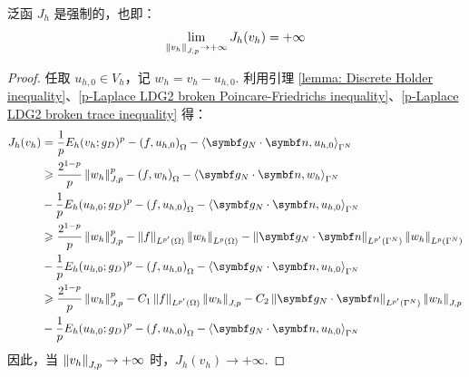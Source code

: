 \begin{proposition}[Coercivity]\label{p-Laplace LDG2 discrete coercivity} %
	泛函 \(J_{h}\) 是强制的，也即：
	\begin{equation*}
		\lim_{\left\lVert v_{h}\right\rVert_{J, p} \to +\infty} J_{h}(v_{h}) = +\infty
	\end{equation*}

	\begin{proof}
		任取 \(u_{h,0} \in V_{h}\)，记 \(w_{h} = v_{h} - u_{h,0}\). 利用引理 \ref{lemma: Discrete Holder inequality}、\ref{p-Laplace LDG2 broken Poincare-Friedrichs inequality}、\ref{p-Laplace LDG2 broken trace inequality} 得：
		\begin{align*}
			J_{h}(v_{h}) 
			& = \frac{1}{p} E_{h}(v_{h}; g_{D})^{p} - \left(f, u_{h,0}\right)_{\Omega} - \left\langle \bm g_{N} \cdot \bm n, u_{h,0} \right\rangle_{\Gamma^{N}} \\
			& \geqslant \frac{2^{1-p}}{p} \norm{w_{h}}_{J, p}^{p} - \left(f, w_{h}\right)_{\Omega} - \left\langle \bm g_{N} \cdot \bm n, w_{h} \right\rangle_{\Gamma^{N}} \\& - \frac{1}{p} E_{h}(u_{h,0}; g_{D})^{p} - \left(f, u_{h,0}\right)_{\Omega} - \left\langle \bm g_{N} \cdot \bm n, u_{h,0} \right\rangle_{\Gamma^{N}} \\
			& \geqslant \frac{2^{1-p}}{p} \norm{w_{h}}_{J, p}^{p} - \norm{f}_{L^{p'}(\Omega)} \norm{w_{h}}_{L^{p}(\Omega)} - \norm{\bm g_{N} \cdot \bm n}_{L^{p'}(\Gamma^{N})} \norm{w_{h}}_{L^{p}(\Gamma^{N})} \\& - \frac{1}{p} E_{h}(u_{h,0}; g_{D})^{p} - \left(f, u_{h,0}\right)_{\Omega} - \left\langle \bm g_{N} \cdot \bm n, u_{h,0} \right\rangle_{\Gamma^{N}} \\
			& \geqslant \frac{2^{1-p}}{p} \norm{w_{h}}_{J, p}^{p} - C_{1} \norm{f}_{L^{p'}(\Omega)} \norm{w_{h}}_{J, p} - C_{2} \norm{\bm g_{N} \cdot \bm n}_{L^{p'}(\Gamma^{N})} \norm{w_{h}}_{J, p} \\& - \frac{1}{p} E_{h}(u_{h,0}; g_{D})^{p} - \left(f, u_{h,0}\right)_{\Omega} - \left\langle \bm g_{N} \cdot \bm n, u_{h,0} \right\rangle_{\Gamma^{N}} 
		\end{align*}
		因此，当 \(\left\lVert v_{h}\right\rVert_{J, p} \to +\infty\) 时，\(J_{h}(v_{h}) \to +\infty\).
	\end{proof}
\end{proposition}



